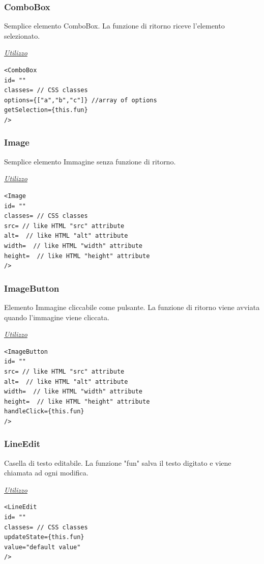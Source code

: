 \subsubsection{ComboBox}
Semplice elemento ComboBox. La funzione di ritorno riceve l'elemento selezionato.
\begin{center}
\underline{\textit{Utilizzo}}
\begin{lstlisting}	
<ComboBox
id= ""
classes= // CSS classes
options={["a","b","c"]} //array of options
getSelection={this.fun}
/>
\end{lstlisting}
\end{center}

\subsubsection{Image}
Semplice elemento Immagine senza funzione di ritorno.
\begin{center}
\underline{\textit{Utilizzo}}
\begin{lstlisting}
<Image
id= ""
classes= // CSS classes
src= // like HTML "src" attribute
alt=  // like HTML "alt" attribute
width=  // like HTML "width" attribute
height=  // like HTML "height" attribute
/>
\end{lstlisting}
\end{center}

\subsubsection{ImageButton}
Elemento Immagine cliccabile come pulsante. La funzione di ritorno viene avviata quando l'immagine viene cliccata.
\begin{center}
\underline{\textit{Utilizzo}}
\begin{lstlisting}
<ImageButton
id= ""
src= // like HTML "src" attribute
alt=  // like HTML "alt" attribute
width=  // like HTML "width" attribute
height=  // like HTML "height" attribute
handleClick={this.fun}
/>
\end{lstlisting}
\end{center}
\newpage

\subsubsection{LineEdit}
Casella di testo editabile. La funzione "fun" salva il testo digitato e viene chiamata ad ogni modifica.
\begin{center}
\underline{\textit{Utilizzo}}
\begin{lstlisting}
<LineEdit 
id= ""
classes= // CSS classes
updateState={this.fun}
value="default value"
/>
\end{lstlisting}
\end{center}

